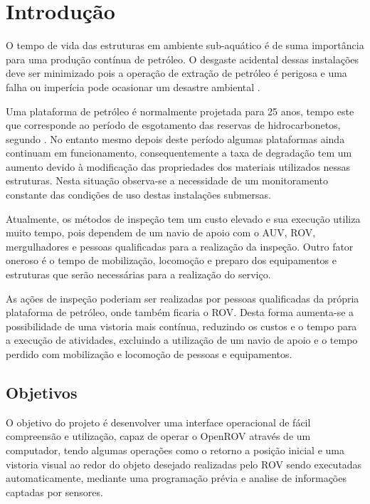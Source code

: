 \chapter{Introdução}

O tempo de vida das estruturas em ambiente sub-aquático é de suma importância para uma produção contínua de petróleo. O desgaste acidental dessas instalações deve ser minimizado pois a operação de extração de petróleo é perigosa e uma falha ou imperícia pode ocasionar um desastre ambiental \cite{0}.

Uma plataforma de petróleo é normalmente projetada para 25 anos, tempo este que corresponde ao período de esgotamento das reservas de hidrocarbonetos, segundo \cite{1}. No entanto mesmo depois deste período algumas plataformas ainda continuam em funcionamento, consequentemente a taxa de degradação tem um aumento devido à modificação das propriedades dos materiais utilizados nessas estruturas. Nesta situação observa-se a necessidade de um monitoramento constante das condições de uso destas instalações submersas.    
 
Atualmente, os métodos de inspeção tem um custo elevado e sua execução utiliza muito tempo, pois dependem de um navio de apoio com o AUV, ROV, mergulhadores e pessoas qualificadas para a realização da inspeção. Outro fator oneroso é o tempo de mobilização, locomoção e preparo dos equipamentos e estruturas que serão necessárias para a realização do serviço.
 
As ações de inspeção poderiam ser realizadas por pessoas qualificadas da própria plataforma de petróleo, onde também ficaria o ROV. Desta forma aumenta-se a possibilidade de uma vistoria mais contínua, reduzindo os custos e o tempo para a execução de atividades, excluindo a utilização de um navio de apoio e o tempo perdido com mobilização e locomoção de pessoas e equipamentos.
 


\section{Objetivos}
O objetivo do projeto é desenvolver uma interface operacional de fácil compreensão e utilização, capaz de operar o OpenROV através de um computador, tendo algumas operações como o retorno a posição inicial e uma vistoria visual ao redor do objeto desejado realizadas pelo ROV sendo executadas automaticamente, mediante uma programação prévia e analise de informações captadas por sensores. 

